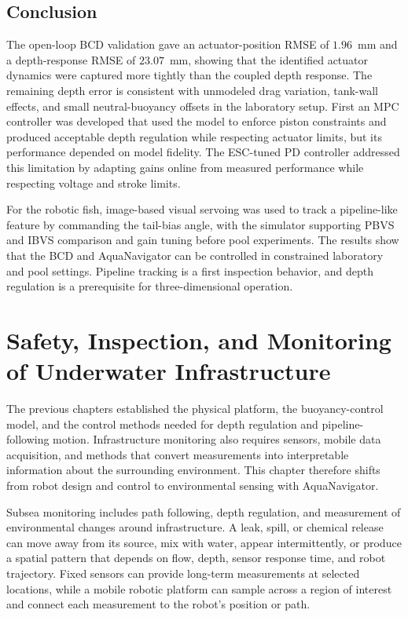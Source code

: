 \documentclass{uhcoethesis}
\begin{document}
\section{Conclusion}
The open-loop BCD validation gave an actuator-position RMSE of $1.96$~mm and a depth-response RMSE of $23.07$~mm, showing that the identified actuator dynamics were captured more tightly than the coupled depth response. The remaining depth error is consistent with unmodeled drag variation, tank-wall effects, and small neutral-buoyancy offsets in the laboratory setup. First an MPC controller was developed that used the model to enforce piston constraints and produced acceptable depth regulation while respecting actuator limits, but its performance depended on model fidelity. The ESC-tuned PD controller addressed this limitation by adapting gains online from measured performance while respecting voltage and stroke limits.

For the robotic fish, image-based visual servoing was used to track a pipeline-like feature by commanding the tail-bias angle, with the simulator supporting PBVS and IBVS comparison and gain tuning before pool experiments. The results show that the BCD and AquaNavigator can be controlled in constrained laboratory and pool settings. Pipeline tracking is a first inspection behavior, and depth regulation is a prerequisite for three-dimensional operation.

\chapter{Safety, Inspection, and Monitoring of Underwater Infrastructure}

The previous chapters established the physical platform, the buoyancy-control model, and the control methods needed for depth regulation and pipeline-following motion. Infrastructure monitoring also requires sensors, mobile data acquisition, and methods that convert measurements into interpretable information about the surrounding environment. This chapter therefore shifts from robot design and control to environmental sensing with AquaNavigator.

Subsea monitoring includes path following, depth regulation, and measurement of environmental changes around infrastructure. A leak, spill, or chemical release can move away from its source, mix with water, appear intermittently, or produce a spatial pattern that depends on flow, depth, sensor response time, and robot trajectory. Fixed sensors can provide long-term measurements at selected locations, while a mobile robotic platform can sample across a region of interest and connect each measurement to the robot's position or path.
\end{document}
